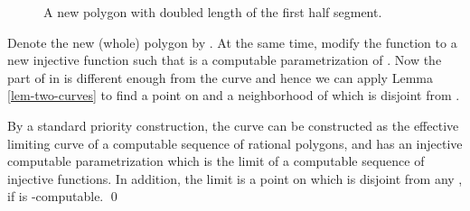 \documentclass{LMCS}
\theoremstyle{plain}
\begin{document}
\begin{figure}[h]
\begin{center}
\end{center}
\caption{A new polygon  with doubled length of the first half segment.}\label{fig-M-N}
\end{figure}

\noindent Denote the new (whole) polygon by . At the same time, modify the function  to a new injective function  such that  is a computable parametrization of .  Now the part of  in  is different enough from the curve  and hence we can apply Lemma \ref{lem-two-curves} to find a point on  and a neighborhood  of   which is disjoint from .

By a standard priority construction, the curve  can be constructed as the effective limiting curve of a computable sequence  of rational polygons, and  has an injective computable parametrization  which is the limit of a computable sequence  of injective functions. In addition, the limit  is a point on  which is disjoint from any , if  is -computable.
\qed
\end{document}
